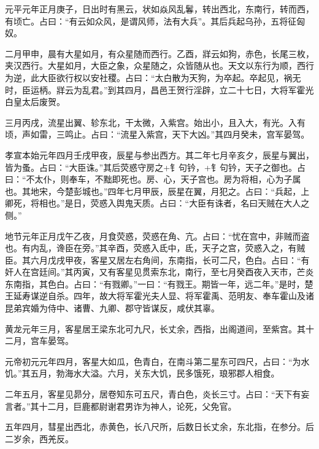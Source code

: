 \documentclass[12pt,UTF8]{ctexbook}
\begin{document}
元平元年正月庚子，日出时有黑云，状如焱风乱鬊，转出西北，东南行，转而西，有顷亡。占曰：“有云如众风，是谓风师，法有大兵”。其后兵起乌孙，五将征匈奴。



二月甲申，晨有大星如月，有众星随而西行。乙酉，牂云如狗，赤色，长尾三枚，夹汉西行。大星如月，大臣之象，众星随之，众皆随从也。天文以东行为顺，西行为逆，此大臣欲行权以安社稷。占曰：“太白散为天狗，为卒起。卒起见，祸无时，臣运柄。牂云为乱君。”到其四月，昌邑王贺行淫辟，立二十七日，大将军霍光白皇太后废贺。



三月丙戌，流星出翼、轸东北，干太微，入紫宫。始出小，且入大，有光。入有顷，声如雷，三鸣止。占曰：“流星入紫宫，天下大凶。”其四月癸未，宫军晏驾。



孝宣本始元年四月壬戌甲夜，辰星与参出西方。其二年七月辛亥夕，辰星与翼出，皆为蚤。占曰：“大臣诛。”其后荧惑守房之+钅句钤，+钅句钤，天子之御也。占曰：“不太仆，则奉车，不黜即死也。房、心，天子宫也。房为将相，心为子属也。其地宋，今楚彭城也。”四年七月甲辰，辰星在翼，月犯之。占曰：“兵起，上卿死，将相也。”是日，荧惑入舆鬼天质。占曰：“大臣有诛者，名曰天贼在大人之侧。”



地节元年正月戊午乙夜，月食荧惑，荧惑在角、亢。占曰：“忧在宫中，非贼而盗也。有内乱，谗臣在旁。”其辛酉，荧惑入氐中，氐，天子之宫，荧惑入之，有贼臣。其六月戊戌甲夜，客星又居左右角间，东南指，长可二尺，色白。占曰：“有奸人在宫廷间。”其丙寅，又有客星见贯索东北，南行，至七月癸酉夜入天市，芒炎东南指，其色白。占曰：“有戮卿。”一曰：“有戮王。期皆一年，远二年。”是时，楚王延寿谋逆自杀。四年，故大将军霍光夫人显、将军霍禹、范明友、奉车霍山及诸昆弟宾婚为侍中、诸曹、九卿、郡守皆谋反，咸伏其辜。



黄龙元年三月，客星居王梁东北可九尺，长丈余，西指，出阁道间，至紫宫。其十二月，宫车晏驾。



元帝初元元年四月，客星大如瓜，色青白，在南斗第二星东可四尺，占曰：“为水饥。”其五月，勃海水大溢。六月，关东大饥，民多饿死，琅邪郡人相食。



二年五月，客星见昴分，居卷知东可五尺，青白色，炎长三寸。占曰：“天下有妄言者。”其十二月，巨鹿都尉谢君男诈为神人，论死，父免官。



五年四月，彗星出西北，赤黄色，长八尺所，后数日长丈余，东北指，在参分。后二岁余，西羌反。
\end{document}
